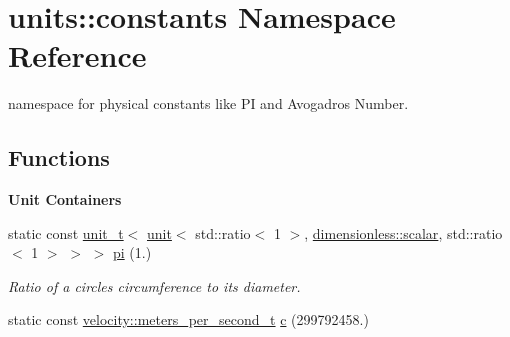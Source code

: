 \hypertarget{namespaceunits_1_1constants}{}\section{units\+:\+:constants Namespace Reference}
\label{namespaceunits_1_1constants}


namespace for physical constants like P\+I and Avogadro\textquotesingle{}s Number.  


\subsection*{Functions}
\begin{Indent}{\bf Unit Containers}\par
{\em \label{namespaceunits_1_1constants_constantContainers}%
\hypertarget{namespaceunits_1_1constants_constantContainers}{}%
}\begin{DoxyCompactItemize}
\item 
\hypertarget{namespaceunits_1_1constants_a2a49f99b6adbb852fb62b5584c902f78}{}static const \hyperlink{classunits_1_1unit__t}{unit\+\_\+t}$<$ \hyperlink{structunits_1_1unit}{unit}$<$ std\+::ratio$<$ 1 $>$, \hyperlink{structunits_1_1unit}{dimensionless\+::scalar}, std\+::ratio$<$ 1 $>$ $>$ $>$ \hyperlink{namespaceunits_1_1constants_a2a49f99b6adbb852fb62b5584c902f78}{pi} (1.)\label{namespaceunits_1_1constants_a2a49f99b6adbb852fb62b5584c902f78}

\begin{DoxyCompactList}\small\item\em Ratio of a circle\textquotesingle{}s circumference to its diameter. \end{DoxyCompactList}\item 
\hypertarget{namespaceunits_1_1constants_af2f6ceb36b94d17be484ab030a88073e}{}static const \hyperlink{classunits_1_1unit__t}{velocity\+::meters\+\_\+per\+\_\+second\+\_\+t} \hyperlink{namespaceunits_1_1constants_af2f6ceb36b94d17be484ab030a88073e}{c} (299792458.)\label{namespaceunits_1_1constants_af2f6ceb36b94d17be484ab030a88073e}


\end{DoxyCompactItemize}
\end{Indent}
